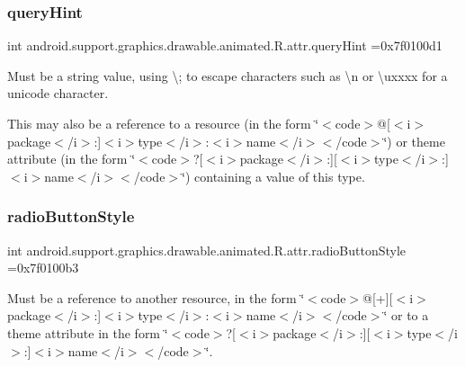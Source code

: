 \subsubsection{\texorpdfstring{query\+Hint}{queryHint}}
{\footnotesize\ttfamily int android.\+support.\+graphics.\+drawable.\+animated.\+R.\+attr.\+query\+Hint =0x7f0100d1\hspace{0.3cm}{\ttfamily [static]}}

Must be a string value, using \textquotesingle{}\textbackslash{};\textquotesingle{} to escape characters such as \textquotesingle{}\textbackslash{}n\textquotesingle{} or \textquotesingle{}\textbackslash{}uxxxx\textquotesingle{} for a unicode character. 

This may also be a reference to a resource (in the form \char`\"{}$<$code$>$@\mbox{[}$<$i$>$package$<$/i$>$\+:\mbox{]}$<$i$>$type$<$/i$>$\+:$<$i$>$name$<$/i$>$$<$/code$>$\char`\"{}) or theme attribute (in the form \char`\"{}$<$code$>$?\mbox{[}$<$i$>$package$<$/i$>$\+:\mbox{]}\mbox{[}$<$i$>$type$<$/i$>$\+:\mbox{]}$<$i$>$name$<$/i$>$$<$/code$>$\char`\"{}) containing a value of this type. \mbox{\label{classandroid_1_1support_1_1graphics_1_1drawable_1_1animated_1_1R_1_1attr_a191038a5c71147a04311b671f74cc7b0}} 
\subsubsection{\texorpdfstring{radio\+Button\+Style}{radioButtonStyle}}
{\footnotesize\ttfamily int android.\+support.\+graphics.\+drawable.\+animated.\+R.\+attr.\+radio\+Button\+Style =0x7f0100b3\hspace{0.3cm}{\ttfamily [static]}}

Must be a reference to another resource, in the form \char`\"{}$<$code$>$@\mbox{[}+\mbox{]}\mbox{[}$<$i$>$package$<$/i$>$\+:\mbox{]}$<$i$>$type$<$/i$>$\+:$<$i$>$name$<$/i$>$$<$/code$>$\char`\"{} or to a theme attribute in the form \char`\"{}$<$code$>$?\mbox{[}$<$i$>$package$<$/i$>$\+:\mbox{]}\mbox{[}$<$i$>$type$<$/i$>$\+:\mbox{]}$<$i$>$name$<$/i$>$$<$/code$>$\char`\"{}. \mbox{\label{classandroid_1_1support_1_1graphics_1_1drawable_1_1animated_1_1R_1_1attr_a27909b0f9ddcebfdedc104a8ae901712}} 
